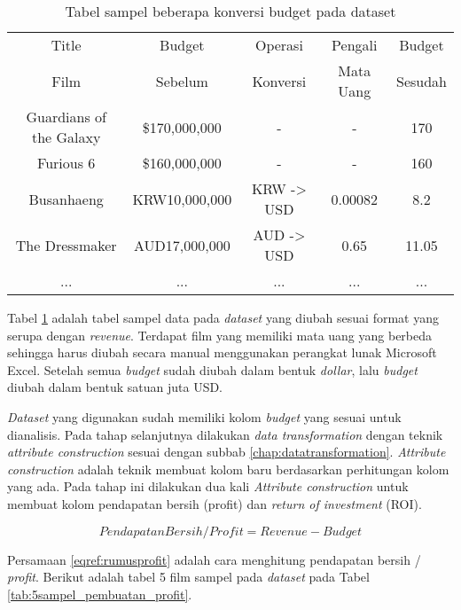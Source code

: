 \begin{table}[H]
\caption{Tabel sampel beberapa konversi budget pada dataset}
\centering
\begin{tabular}{|c|c|c|c|c|}
 \hline 
 Title & Budget  & Operasi & Pengali  & Budget \\ 
 Film  & Sebelum & Konversi & Mata Uang & Sesudah \\
 \hline
 Guardians of the Galaxy & \$170,000,000  & - & - & 170 \\ 
 \hline 
 Furious 6  & \$160,000,000  & - & - & 160 \\ 
 \hline 
 Busanhaeng & KRW10,000,000  & KRW -> USD & 0.00082 & 8.2 \\ 
 \hline 
 The Dressmaker & AUD17,000,000 & AUD -> USD & 0.65 & 11.05 \\ 
 \hline 
 ... & ... & ... & ... & ... \\ 
 \hline 
 \end{tabular}  
\label{tab:sampelkonversibudgetpadadataset}
\end{table}

Tabel \ref{tab:sampelkonversibudgetpadadataset} adalah tabel sampel data pada \textit{dataset} yang diubah sesuai format yang serupa dengan \textit{revenue}. Terdapat film yang memiliki mata uang yang berbeda sehingga harus diubah secara manual menggunakan perangkat lunak Microsoft Excel. Setelah semua \textit{budget} sudah diubah dalam bentuk \textit{dollar}, lalu \textit{budget} diubah dalam bentuk satuan juta USD. 

\textit{Dataset} yang digunakan sudah memiliki kolom \textit{budget} yang sesuai untuk dianalisis. Pada tahap selanjutnya dilakukan \textit{data transformation} dengan teknik \textit{attribute construction} sesuai dengan subbab \ref{chap:datatransformation}. \textit{Attribute construction} adalah teknik membuat kolom baru berdasarkan perhitungan kolom yang ada. Pada tahap ini dilakukan dua kali \textit{Attribute construction} untuk membuat kolom pendapatan bersih (profit) dan \textit{return of investment} (ROI).

\begin{equation}
Pendapatan Bersih / Profit = Revenue - Budget
\label{eqref:rumusprofit}
\end{equation} 

Persamaan \ref{eqref:rumusprofit} adalah cara menghitung pendapatan bersih / \textit{profit}. Berikut adalah tabel 5 film sampel pada \textit{dataset} pada Tabel \ref{tab:5sampel_pembuatan_profit}.

